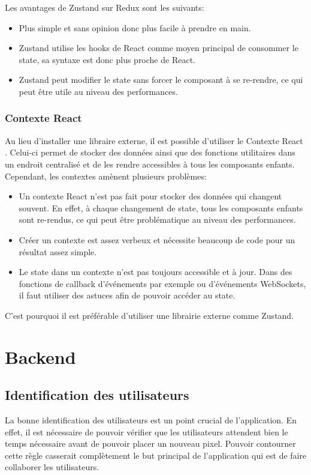 Les avantages de Zustand sur Redux sont les suivants:
\begin{itemize}
  \item Plus simple et sans opinion donc plus facile à prendre en main.
  \item Zustand utilise les hooks de React comme moyen principal de consommer le state, sa syntaxe est donc plus proche de React.
  \item Zustand peut modifier le state sans forcer le composant à se re-rendre, ce qui peut être utile au niveau des performances.
\end{itemize}

\subsubsection{Contexte React}

Au lieu d'installer une libraire externe, il est possible d'utiliser le Contexte React \cite{react-context}. Celui-ci permet de stocker des données ainsi que des fonctions utilitaires dans un endroit centralisé et de les rendre accessibles à tous les composants enfants. Cependant, les contextes amènent plusieurs problèmes:

\begin{itemize}
  \item Un contexte React n'est pas fait pour stocker des données qui changent souvent. En effet, à chaque changement de state, tous les composants enfants sont re-rendus, ce qui peut être problématique au niveau des performances.
  \item Créer un contexte est assez verbeux et nécessite beaucoup de code pour un résultat assez simple.
  \item Le state dans un contexte n'est pas toujours accessible et à jour. Dans des fonctions de callback d'événements par exemple ou d'événements WebSockets, il faut utiliser des astuces afin de pouvoir accéder au state.
\end{itemize}

C'est pourquoi il est préférable d'utiliser une librairie externe comme Zustand.

\section{Backend}

\subsection{Identification des utilisateurs}
La bonne identification des utilisateurs est un point crucial de l'application. En effet, il est nécessaire de pouvoir vérifier que les utilisateurs attendent bien le temps nécessaire avant de pouvoir placer un nouveau pixel. Pouvoir contourner cette règle casserait complètement le but principal de l'application qui est de faire collaborer les utilisateurs.

